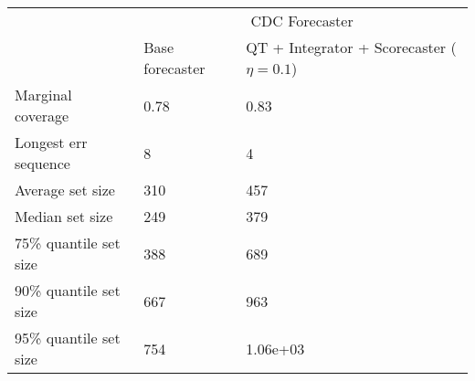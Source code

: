 \begin{tabular}{lll}
\toprule
& \multicolumn{2}{c}{CDC Forecaster} \\
& Base forecaster & QT + Integrator + Scorecaster ($\eta=0.1$) \\
\midrule
Marginal coverage & 0.78 & 0.83 \\
Longest err sequence & 8 & 4 \\
Average set size & 310 & 457 \\
Median set size & 249 & 379 \\
75\% quantile set size & 388 & 689 \\
90\% quantile set size & 667 & 963 \\
95\% quantile set size & 754 & 1.06e+03 \\
\bottomrule
\end{tabular}
